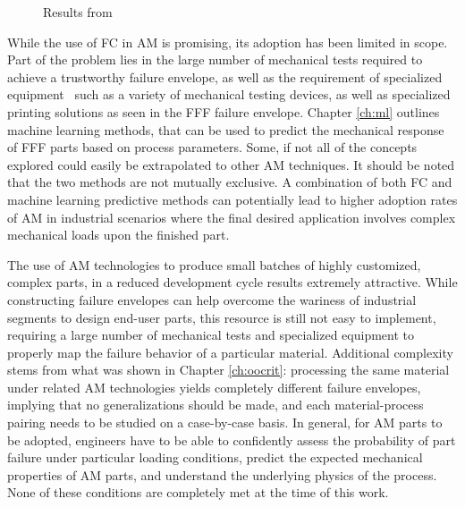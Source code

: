 \documentclass[main.tex]{subfiles}
\begin{document}
\begin{figure}[!htbp]
	\center
	\hfill
	\caption{Results from \cite{MazzeiJCompSci}} \label{fig:jcompscir}
\end{figure} 


While the use of FC in AM is promising, its adoption has been limited in scope. Part of the problem lies in the large number of mechanical tests required to achieve a trustworthy failure envelope, as well as the requirement of specialized equipment \textendash~such as a variety of mechanical testing devices, as well as specialized printing solutions as seen in the FFF failure envelope. Chapter \ref{ch:ml} outlines  machine learning methods, that can be used to predict the mechanical response of FFF parts based on process parameters. Some, if not all of the concepts explored could easily be extrapolated to other AM techniques. It should be noted that the two methods are not mutually exclusive. A combination of both FC and machine learning predictive methods can potentially lead to higher adoption rates of AM in industrial scenarios where the final desired application involves complex mechanical loads upon the finished part.  

The use of AM technologies to produce small batches of highly customized, complex parts, in a reduced development cycle results extremely attractive. While constructing failure envelopes can help overcome the wariness of industrial segments to design end-user parts, this resource is still not easy to implement, requiring a large number of mechanical tests and specialized equipment to properly map the failure behavior of a particular material. Additional complexity stems from what was shown in Chapter \ref{ch:oocrit}: processing the same material under related AM technologies yields completely different failure envelopes, implying that no generalizations should be made, and each material-process pairing needs to be studied on a case-by-case basis. In general, for AM parts to be adopted, engineers have to be able to confidently assess the probability of part failure under particular loading conditions, predict the expected mechanical properties of AM parts, and understand the underlying physics of the process. None of these conditions are completely met at the time of this work.
\end{document}
